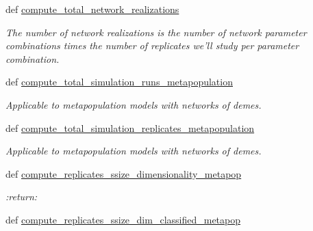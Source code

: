 \begin{DoxyCompactItemize}
def \hyperlink{classctpy_1_1math_1_1simulation__calculations_1_1_simulation_calculations_a80b8bc79f51913c9ec1de88f2077923f}{compute\-\_\-total\-\_\-network\-\_\-realizations}
\begin{DoxyCompactList}\small\item\em The number of network realizations is the number of network parameter combinations times the number of replicates we'll study per parameter combination. \end{DoxyCompactList}\item 
def \hyperlink{classctpy_1_1math_1_1simulation__calculations_1_1_simulation_calculations_ab4c7d2bde540dc4a98bf68030f7858b2}{compute\-\_\-total\-\_\-simulation\-\_\-runs\-\_\-metapopulation}
\begin{DoxyCompactList}\small\item\em Applicable to metapopulation models with networks of demes. \end{DoxyCompactList}\item 
def \hyperlink{classctpy_1_1math_1_1simulation__calculations_1_1_simulation_calculations_a9a2a4b527030b8870dc61c594058e8f4}{compute\-\_\-total\-\_\-simulation\-\_\-replicates\-\_\-metapopulation}
\begin{DoxyCompactList}\small\item\em Applicable to metapopulation models with networks of demes. \end{DoxyCompactList}\item 
\hypertarget{classctpy_1_1math_1_1simulation__calculations_1_1_simulation_calculations_a8ad4d81250f51646c2fc9446b2890a59}{def \hyperlink{classctpy_1_1math_1_1simulation__calculations_1_1_simulation_calculations_a8ad4d81250f51646c2fc9446b2890a59}{compute\-\_\-replicates\-\_\-ssize\-\_\-dimensionality\-\_\-metapop}}\label{classctpy_1_1math_1_1simulation__calculations_1_1_simulation_calculations_a8ad4d81250f51646c2fc9446b2890a59}

\begin{DoxyCompactList}\small\item\em \-:return\-: \end{DoxyCompactList}\item 
\hypertarget{classctpy_1_1math_1_1simulation__calculations_1_1_simulation_calculations_a1cf5ec800072697168f6e8637500d960}{def \hyperlink{classctpy_1_1math_1_1simulation__calculations_1_1_simulation_calculations_a1cf5ec800072697168f6e8637500d960}{compute\-\_\-replicates\-\_\-ssize\-\_\-dim\-\_\-classified\-\_\-metapop}}\label{classctpy_1_1math_1_1simulation__calculations_1_1_simulation_calculations_a1cf5ec800072697168f6e8637500d960}


\end{DoxyCompactItemize}
